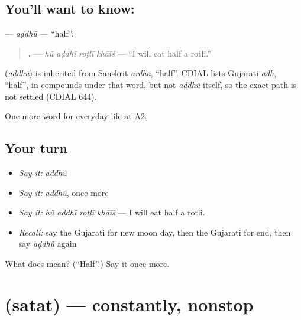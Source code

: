 \subsection*{You'll want to know: }
\textbf{} — \emph{aḍdhũ} — \textquotedblleft{}half\textquotedblright{}.

\begin{quote}
\textbf{   .} — \emph{hũ aḍdhī roṭlī khāīś} — \textquotedblleft{}I will eat half a rotli.\textquotedblright{}
\end{quote}

\begin{cousinweb}
\textbf{} (\emph{aḍdhũ}) is inherited from Sanskrit \emph{ardha}, \textquotedblleft{}half\textquotedblright{}. CDIAL lists Gujarati \emph{adh}, \textquotedblleft{}half\textquotedblright{}, in compounds under that word, but not \emph{aḍdhũ} itself, so the exact path is not settled (CDIAL 644).
\end{cousinweb}

\begin{grammarlens}[title={What you've built}]
One more word for everyday life at A2.
\end{grammarlens}

\subsection*{Your turn}
\begin{itemize}
\raggedright
  \item \emph{Say it:} \emph{aḍdhũ}
  \item \emph{Say it:} \emph{aḍdhũ}, once more
  \item \emph{Say it:} \emph{hũ aḍdhī roṭlī khāīś} — I will eat half a rotli.
  \item \emph{Recall:} say the Gujarati for new moon day, then the Gujarati for end, then say \emph{aḍdhũ} again
\end{itemize}

\begin{tcolorbox}[breakable,colback=teal!4,colframe=teal!35!black,title={Before you move on}]
What does  mean? (\textquotedblleft{}Half\textquotedblright{}.) Say it once more.
\end{tcolorbox}
\section[\texorpdfstring{\gu{સતત} (satat)}{સતત (satat)}]{ (satat) — constantly, nonstop}

